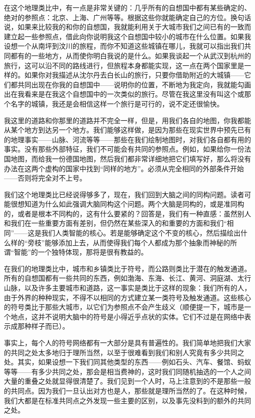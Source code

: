 在这个地理类比中，有一点是非常关键的：几乎所有的自想国中都有某些确定的、绝对的参照点：北京、上海、广州等等。根据这些你就能确定自己的方位。换句话说，如果来比较我的和你的自想国，我就能利用关于大城市我们之间已有的一致而建立起一些参照点，借此向你说明我这个自想国中较小的城市在什么位置。如果我设想一个从南坪到汶川的旅程，而你不知道这些城镇在哪儿，我就可以指出我们共同都有的一些地方，从而使你明白我说的是什么。如果我谈起一个从武汉到杭州的旅行，这可以沿不同的路线进行，但旅程本身都能实现，这一点在两个国家里是一样的。如果你对我描述从沈尔丹去白长山的旅行，只要你借助附近的大城镇——它们都共同出现在你我的自想国中——说明你的位置，不断地为我定向，我就能勾画出在我看来是在我这个自想国中的一次类似的旅行。尽管在我这里没有叫这个或那个名字的城镇，我还是会相信这样一个旅行是可行的，说不定还很愉快。

我这里的道路和你那里的道路并不完全一样，但是，用我们各自的地图，你我都能从某个地方到达另一个地方。我们能够这样做，是因为那些在现实世界中预先已有的地理事实——山脉、河流等等——那些在我们绘制地图时，对我们各自都有用的事实。没有那些外部特征，我们不可能会有共同的参照点。例如，如果给你一份法国地图，而给我一份德国地图，然后我们都非常详细地把它们填写好，那么将没有办法在这两个虚构的国家中找到“同样的地方”。必须从完全相同的外部条件开始——否则将完全对不上号。

我们这个地理类比已经说得够多了，现在，我们回到大脑之间的同构问题。读者可能很想知道为什么如此强调大脑同构这个问题。两个大脑是同构的，或是准同构的，或者是根本不同构的，这有什么要紧的？回答是，我们有一种直感：虽然别人和我们在一些重要方面有差别，但仍然在某些深入的和重要的方面和我们“相同”——这是我们人类智能的核心。若是能够确定这个不变的核心，然后描绘出什么样的“旁枝”能够添加上去，从而使得我们每个人都成为那个抽象而神秘的所谓“智能”的一个独特体现，那将是很有教益的。

在我们的地理类比中，城市和乡镇类比于符号，而公路则类比于潜在的触发通道。所有的自想国都有一些共同的东西，例如渤海、东海、长江、黄河、洞庭湖、太行山脉，以及许多主要城市和道路，这一事实是类比于这样的现象：我们所有的人，由于外界的种种现实，不得不以相同的方式建立某一类符号及触发通道。这些核心的符号类比于那些大城市，以它们为参照点不会产生歧义（顺便提一下，城市是一个地点，这并不说明大脑中的符号是小得近乎点状的实体。它们不过是在网络中表示成那种样子而已）。

事实上，每个人的符号网络都有一大部分是具有普遍性的。我们简单地把我们大家的共同之处太多地归于理所当然，以至于很难看到我们和别人究竟有多少共同之处。其实，如果设想一下我们同其他类型的东西——例如石头、汽车、餐馆、蚂蚁等等——有多少共同之处，那会是相当费神的，这时我们同随机抽选的一个人之间大量的重叠之处就显得很清楚了。我们见到一个人时，马上注意到的不是那些一般的共同点。因为我们一旦认出对方也是人，那些就是理所当然的了。在这种时候，我们大都是在标准共同点之外发现一些主要的区别，以及事先没料到的额外的共同之处。

